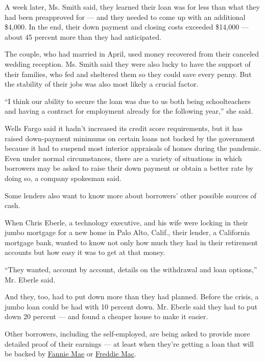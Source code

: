 A week later, Ms. Smith said, they learned their loan was for less than
what they had been preapproved for --- and they needed to come up with
an additional \$4,000. In the end, their down payment and closing costs
exceeded \$14,000 --- about 45 percent more than they had anticipated.

The couple, who had married in April, used money recovered from their
canceled wedding reception. Ms. Smith said they were also lucky to have
the support of their families, who fed and sheltered them so they could
save every penny. But the stability of their jobs was also most likely a
crucial factor.

``I think our ability to secure the loan was due to us both being
schoolteachers and having a contract for employment already for the
following year,'' she said.

Wells Fargo said it hadn't increased its credit score requirements, but
it has raised down-payment minimums on certain loans not backed by the
government because it had to suspend most interior appraisals of homes
during the pandemic. Even under normal circumstances, there are a
variety of situations in which borrowers may be asked to raise their
down payment or obtain a better rate by doing so, a company spokesman
said.

Some lenders also want to know more about borrowers' other possible
sources of cash.

When Chris Eberle, a technology executive, and his wife were locking in
their jumbo mortgage for a new home in Palo Alto, Calif., their lender,
a California mortgage bank, wanted to know not only how much they had in
their retirement accounts but how easy it was to get at that money.

``They wanted, account by account, details on the withdrawal and loan
options,'' Mr. Eberle said.

And they, too, had to put down more than they had planned. Before the
crisis, a jumbo loan could be had with 10 percent down. Mr. Eberle said
they had to put down 20 percent --- and found a cheaper house to make it
easier.

Other borrowers, including the self-employed, are being asked to provide
more detailed proof of their earnings --- at least when they're getting
a loan that will be backed by
\href{https://singlefamily.fanniemae.com/media/22316/display?_ga=2.27818620.1955261175.1593457830-553926868.1583167746\&_gac=1.52708252.1591220517.EAIaIQobChMIyYH3gc7m6QIVlovICh2LUgv0EAMYASAAEgJkPvD_BwE}{Fannie
Mae} or
\href{https://guide.freddiemac.com/app/guide/bulletin/2020-19}{Freddie
Mac}.

